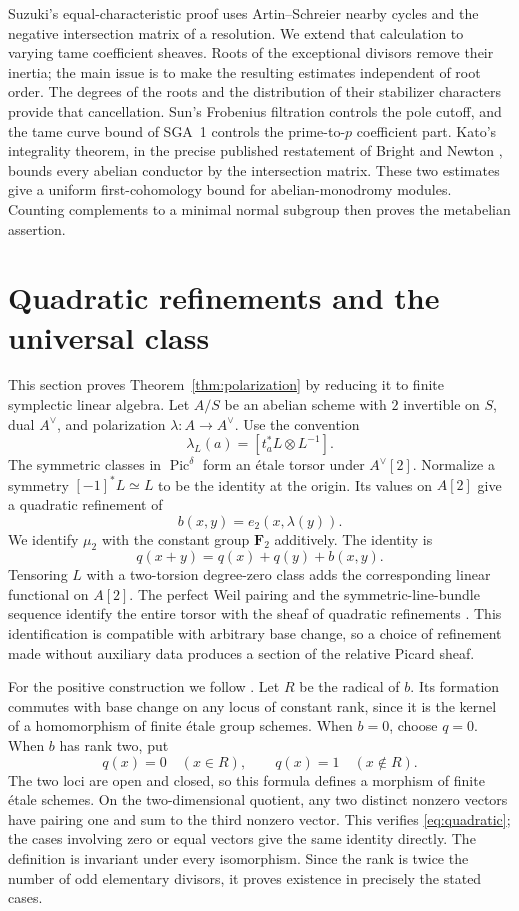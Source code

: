 \documentclass[11pt]{article}
\theoremstyle{remark}\newtheorem{remark}[theorem]{Remark}
\newcommand{\F}{\mathbf F}
\newcommand{\Pic}{\operatorname{Pic}}
\begin{document}
Suzuki's equal-characteristic proof uses Artin--Schreier nearby cycles and the negative intersection matrix of a resolution. We extend that calculation to varying tame coefficient sheaves. Roots of the exceptional divisors remove their inertia; the main issue is to make the resulting estimates independent of root order. The degrees of the roots and the distribution of their stabilizer characters provide that cancellation. Sun's Frobenius filtration controls the pole cutoff, and the tame curve bound of SGA~1 controls the prime-to-$p$ coefficient part. Kato's integrality theorem, in the precise published restatement of Bright and Newton \cite[Theorem 4.1, pp.~848--849]{BN}, bounds every abelian conductor by the intersection matrix. These two estimates give a uniform first-cohomology bound for abelian-monodromy modules. Counting complements to a minimal normal subgroup then proves the metabelian assertion.

\section{Quadratic refinements and the universal class}

This section proves Theorem~\ref{thm:polarization} by reducing it to finite symplectic linear algebra. Let $A/S$ be an abelian scheme with $2$ invertible on $S$, dual $A^\vee$, and polarization $\lambda:A\to A^\vee$. Use the convention
\[
 \lambda_L(a)=[t_a^*L\otimes L^{-1}].
\]
The symmetric classes in $\Pic^\delta$ form an \'etale torsor under $A^\vee[2]$. Normalize a symmetry $[-1]^*L\simeq L$ to be the identity at the origin. Its values on $A[2]$ give a quadratic refinement of
\[
 b(x,y)=e_2(x,\lambda(y)).
\]
We identify $\mu_2$ with the constant group $\F_2$ additively. The identity is
\begin{equation}\label{eq:quadratic}
 q(x+y)=q(x)+q(y)+b(x,y).
\end{equation}
Tensoring $L$ with a two-torsion degree-zero class adds the corresponding linear functional on $A[2]$. The perfect Weil pairing and the symmetric-line-bundle sequence identify the entire torsor with the sheaf of quadratic refinements \cite[Proposition 3.6]{PR}. This identification is compatible with arbitrary base change, so a choice of refinement made without auxiliary data produces a section of the relative Picard sheaf.

For the positive construction we follow \cite[Proposition~3.12(f)]{PR}. Let $R$ be the radical of $b$. Its formation commutes with base change on any locus of constant rank, since it is the kernel of a homomorphism of finite \'etale group schemes. When $b=0$, choose $q=0$. When $b$ has rank two, put
\[
 q(x)=0\quad(x\in R),\qquad q(x)=1\quad(x\notin R).
\]
The two loci are open and closed, so this formula defines a morphism of finite \'etale schemes. On the two-dimensional quotient, any two distinct nonzero vectors have pairing one and sum to the third nonzero vector. This verifies \eqref{eq:quadratic}; the cases involving zero or equal vectors give the same identity directly. The definition is invariant under every isomorphism. Since the rank is twice the number of odd elementary divisors, it proves existence in precisely the stated cases.
\end{document}
